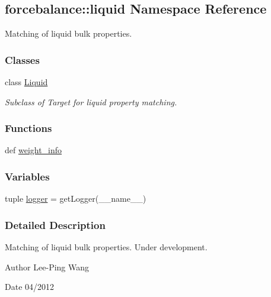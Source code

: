 \hypertarget{namespaceforcebalance_1_1liquid}{\subsection{forcebalance\-:\-:liquid \-Namespace \-Reference}
\label{namespaceforcebalance_1_1liquid}
}


\-Matching of liquid bulk properties.  


\subsubsection*{\-Classes}
\begin{DoxyCompactItemize}
\item 
class \hyperlink{classforcebalance_1_1liquid_1_1Liquid}{\-Liquid}
\begin{DoxyCompactList}\small\item\em \-Subclass of \-Target for liquid property matching. \end{DoxyCompactList}\end{DoxyCompactItemize}
\subsubsection*{\-Functions}
\begin{DoxyCompactItemize}
\item 
def \hyperlink{namespaceforcebalance_1_1liquid_a6f7d54263236f8788c319aee86b460b6}{weight\-\_\-info}
\end{DoxyCompactItemize}
\subsubsection*{\-Variables}
\begin{DoxyCompactItemize}
\item 
tuple \hyperlink{namespaceforcebalance_1_1liquid_a82691ecf186d3b94b7c4915ac590d178}{logger} = get\-Logger(\-\_\-\-\_\-name\-\_\-\-\_\-)
\end{DoxyCompactItemize}


\subsubsection{\-Detailed \-Description}
\-Matching of liquid bulk properties. \-Under development.

\begin{DoxyAuthor}{\-Author}
\-Lee-\/\-Ping \-Wang 
\end{DoxyAuthor}
\begin{DoxyDate}{\-Date}
04/2012 
\end{DoxyDate}


